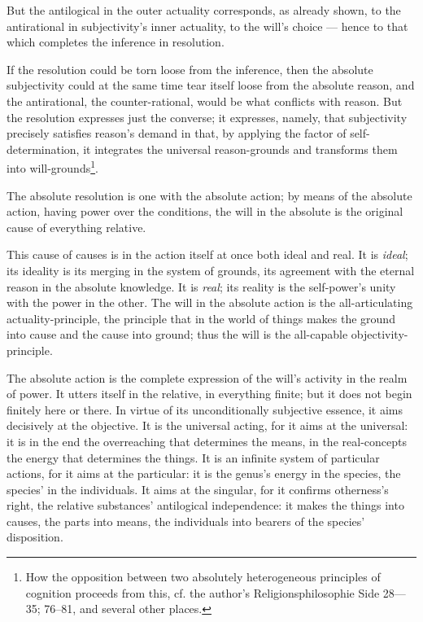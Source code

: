 \documentclass[12pt]{book}
\begin{document}
But the antilogical in the outer actuality corresponds, as already
shown, to the antirational in subjectivity's inner actuality, to the
will's choice --- hence to that which completes the inference in
resolution.

If the resolution could be torn loose from the inference, then the
absolute subjectivity could at the same time tear itself loose from
the absolute reason, and the antirational, the counter-rational,
would be what conflicts with reason. But the resolution expresses
just the converse; it expresses, namely, that subjectivity precisely
satisfies reason's demand in that, by applying the factor of
self-determination, it integrates the universal reason-grounds and
transforms them into will-grounds\footnote{How the opposition
between two absolutely heterogeneous principles of cognition
proceeds from this, cf. the author's Religionsphilosophie Side
28---35; 76--81, and several other places.}.

The absolute resolution is one with the absolute action; by means of
the absolute action, having power over the conditions, the will in
the absolute is the original cause of everything relative.

This cause of causes is in the action itself at once both ideal and
real. It is \emph{ideal}; its ideality is its merging in the system
of grounds, its agreement with the eternal reason in the absolute
knowledge. It is \emph{real}; its reality is the self-power's unity
with the power in the other. The will in the absolute action is the
all-articulating actuality-principle, the principle that in the
world of things makes the ground into cause and the cause into
ground; thus the will is the all-capable objectivity-principle.

The absolute action is the complete expression of the will's
activity in the realm of power. It utters itself in the relative, in
everything finite; but it does not begin finitely here or there. In
virtue of its unconditionally subjective essence, it aims decisively
at the objective. It is the universal acting, for it aims at the
universal: it is in the end the overreaching that determines the
means, in the real-concepts the energy that determines the things.
It is an infinite system of particular actions, for it aims at the
particular: it is the genus's energy in the species, the species' in
the individuals. It aims at the singular, for it confirms
otherness's right, the relative substances' antilogical
independence: it makes the things into causes, the parts into means,
the individuals into bearers of the species' disposition.
\end{document}

